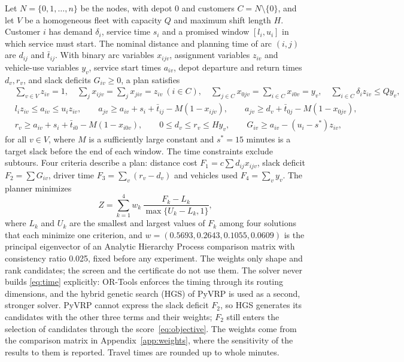 \documentclass[11pt,a4paper]{article}
\theoremstyle{remark}
\begin{document}
Let $N=\{0,1,\ldots,n\}$ be the nodes, with depot 0 and customers
$C=N\setminus\{0\}$, and let $V$ be a homogeneous fleet with capacity $Q$ and
maximum shift length $H$. Customer $i$ has demand $\delta_i$, service time $s_i$
and a promised window $[l_i,u_i]$ in which service must start. The nominal
distance and planning time of arc $(i,j)$ are $d_{ij}$ and $\bar t_{ij}$. With
binary arc variables $x_{ijv}$, assignment variables $z_{iv}$ and vehicle-use
variables $y_v$, service start times $a_{iv}$, depot departure and return times
$d_v,r_v$, and slack deficits $G_{iv}\ge0$, a plan satisfies
\begin{align}
 &\textstyle\sum_{v\in V} z_{iv}=1,\quad
 \sum_{j}x_{ijv}=\sum_{j}x_{jiv}=z_{iv}\ (i\in C),\quad
 \sum_{j\in C}x_{0jv}=\sum_{i\in C}x_{i0v}=y_v,\quad
 \sum_{i\in C}\delta_i z_{iv}\le Qy_v, \label{eq:flow}\\
 &l_iz_{iv}\le a_{iv}\le u_iz_{iv},\qquad
 a_{jv}\ge a_{iv}+s_i+\bar t_{ij}-M(1-x_{ijv}),\qquad
 a_{jv}\ge d_v+\bar t_{0j}-M(1-x_{0jv}), \label{eq:time}\\
 &r_v\ge a_{iv}+s_i+\bar t_{i0}-M(1-x_{i0v}),\qquad 0\le d_v\le r_v\le Hy_v,\qquad
 G_{iv}\ge a_{iv}-(u_i-s^*)z_{iv}, \label{eq:slack}
\end{align}
for all $v\in V$, where $M$ is a sufficiently large constant and $s^*=15$ minutes
is a target slack before the end of each window. The time constraints exclude
subtours. Four criteria describe a plan: distance cost $F_1=c\sum d_{ij}x_{ijv}$,
slack deficit $F_2=\sum G_{iv}$, driver time $F_3=\sum_v(r_v-d_v)$ and vehicles
used $F_4=\sum_v y_v$. The planner minimizes
\begin{equation}
 Z=\sum_{k=1}^4 w_k\,\frac{F_k-L_k}{\max\{U_k-L_k,1\}}, \label{eq:objective}
\end{equation}
where $L_k$ and $U_k$ are the smallest and largest values of $F_k$ among four
solutions that each minimize one criterion, and $w=(0.5693,0.2643,0.1055,0.0609)$
is the principal eigenvector of an Analytic Hierarchy Process comparison matrix
\citep{saaty1980} with consistency ratio 0.025, fixed before any experiment. The
weights only shape and rank candidates; the screen and the certificate do not use
them. The solver never builds \eqref{eq:time} explicitly: OR-Tools
\citep{ortools} enforces the timing through its routing dimensions, and the
hybrid genetic search (HGS) of PyVRP \citep{vidal2022,wouda2024} is used as a
second, stronger solver. PyVRP cannot express the slack deficit $F_2$, so HGS
generates its candidates with the other three terms and their weights; $F_2$ still
enters the selection of candidates through the score~\eqref{eq:objective}. The
weights come from the comparison matrix in Appendix~\ref{app:weights}, where the
sensitivity of the results to them is reported. Travel times are rounded up to whole
minutes.
\end{document}
